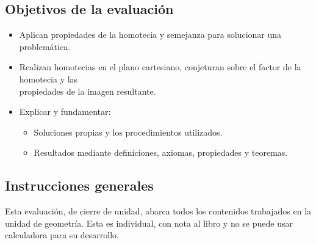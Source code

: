 \documentclass{cdplf-prueba}
\begin{document}
%
\begin{tcbraster}[enhanced,raster columns=3,raster width=\linewidth,raster column skip=3pt,raster force size=false]
    \begin{caja}[title={\sffamily\scshape\bfseries Nombre},height=30pt,add to width=4cm]
    \end{caja}
    \begin{caja}[title={\sffamily\scshape\bfseries Puntaje},height=30pt,add to width=-2cm]
    \end{caja}
    \begin{caja}[title={\sffamily\scshape\bfseries Nota},height=30pt,add to width=-2cm]
    \end{caja}                    
\end{tcbraster}

\subsection*{Objetivos de la evaluación}
\begin{itemize}[]
    \item Aplican propiedades de la homotecia y semejanza para solucionar una \mbox{problemática}.
    \item Realizan homotecias en el plano cartesiano, conjeturan sobre el factor de la homotecia y las 
    \\\mbox{propiedades} de la imagen resultante.
    \item Explicar y fundamentar: 
    \begin{itemize}[]
        \item   Soluciones propias y los procedimientos utilizados.
        \item   Resultados mediante definiciones, axiomas, propiedades y teoremas.
    \end{itemize}
\end{itemize}

\subsection*{Instrucciones generales}

Esta evaluación, de cierre de unidad, abarca todos los contenidos trabajados en la unidad 
de geometría. Esta es individual, con nota al libro y no se puede usar calculadora para su 
desarrollo. 
\end{document}
